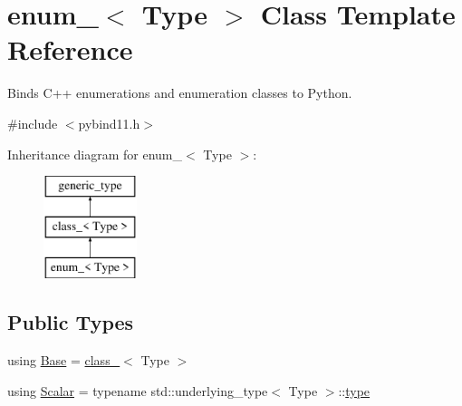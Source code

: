 \hypertarget{classenum__}{}\section{enum\+\_\+$<$ Type $>$ Class Template Reference}
\label{classenum__}


Binds C++ enumerations and enumeration classes to Python.  




{\ttfamily \#include $<$pybind11.\+h$>$}

Inheritance diagram for enum\+\_\+$<$ Type $>$\+:\begin{figure}[H]
\begin{center}
\leavevmode
\includegraphics[height=3.000000cm]{classenum__}
\end{center}
\end{figure}
\subsection*{Public Types}
\begin{DoxyCompactItemize}
\item 
using \mbox{\hyperlink{classenum___a267908cc80a1ac648484ff98c8a49648}{Base}} = \mbox{\hyperlink{classclass__}{class\+\_\+}}$<$ Type $>$
\item 
using \mbox{\hyperlink{classenum___a1825e262342ffd5e7ea411185c9d5bd7}{Scalar}} = typename std\+::underlying\+\_\+type$<$ Type $>$\+::\mbox{\hyperlink{classclass___a90e08a4ecffb596c1f1055f47747ad91}{type}}
\end{DoxyCompactItemize}
